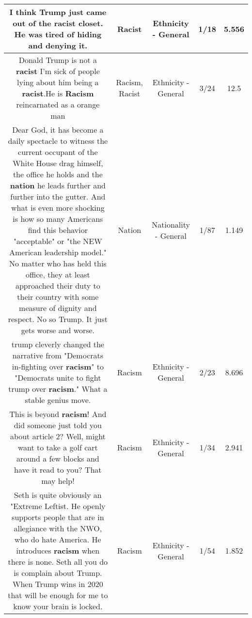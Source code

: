 \documentclass[11pt]{article}
\newlength\mylength
\begin{document}
\begin{center}
\begin{longtable}{|C{.65\mylength}|C{.30\mylength}|C{.12\mylength}|C{.12\mylength}|C{.12\mylength}|}
  \small I think Trump just came out of the \textbf{racist} closet. He was  tired of hiding and denying it.\normalsize   & Racist & Ethnicity - General & 1/18 & 5.556 \\  \hline
  \small Donald Trump is not a \textbf{racist} I'm sick of people lying about him being a \textbf{racist}.He is \textbf{Racism} reincarnated as a orange man\normalsize   & Racism, Racist & Ethnicity - General & 3/24 & 12.5 \\  \hline
  \small Dear God, it has become a daily spectacle to witness the current occupant of the White House drag himself, the office he holds and the \textbf{nation} he leads further and further into the gutter. And what is even more shocking is how so many Americans find this behavior "acceptable" or "the NEW American leadership model." No matter who has held this office, they at least approached their duty to their country with some measure of dignity and respect. No so Trump. It just gets worse and worse.\normalsize   & Nation & Nationality - General & 1/87 & 1.149 \\  \hline
  \small trump cleverly changed the narrative from "Democrats in-fighting over \textbf{racism}" to "Democrats unite to fight trump over \textbf{racism}."  What a stable genius move.\normalsize   & Racism & Ethnicity - General & 2/23 & 8.696 \\  \hline
  \small This is beyond \textbf{racism}! And did someone just told you about article 2? Well, might want to take a golf cart around a few blocks and have it read to you? That may help!\normalsize   & Racism & Ethnicity - General & 1/34 & 2.941 \\  \hline
  \small Seth is quite obviously an "Extreme Leftist. He openly supports people that are in allegiance with the NWO, who do hate America. He introduces \textbf{racism} when there is none. Seth all you do is complain about Trump. When Trump wins in 2020 that will be enough for me to know your brain is locked.\normalsize   & Racism & Ethnicity - General & 1/54 & 1.852 \\  \hline

\end{longtable}
\end{center}
\end{document}
